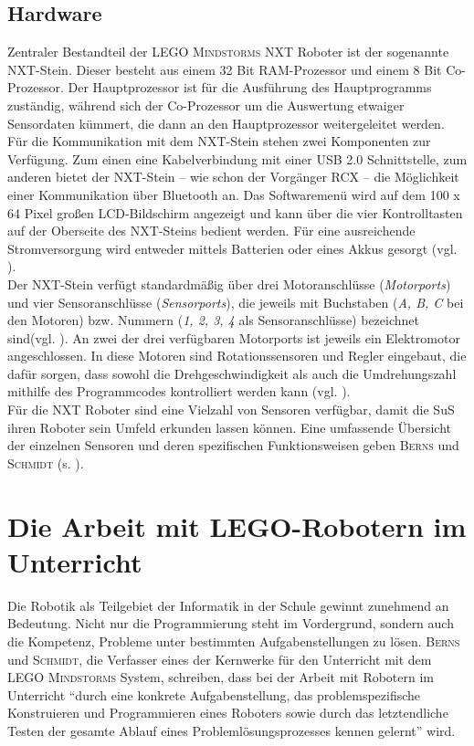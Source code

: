 \documentclass[paper=a4, DIV=calc, BCOR=15mm, twoside=on, onecolumn=on, open = right, titlepage =on, parskip =half, headsepline = on, footsepline = on, chapterprefix = off, appendixprefix = off, fontsize = 12pt, numbers = noenddot, abstract = on]{scrbook}
\begin{document}
\subsection{Hardware}
\onehalfspacing
Zentraler Bestandteil der \textsc{LEGO Mindstorms} NXT Roboter ist der sogenannte NXT-Stein. Dieser besteht aus einem 32 Bit RAM-Prozessor und einem 8 Bit Co-Prozessor. Der Hauptprozessor ist für die Ausführung des Hauptprogramms zuständig, während sich der Co-Prozessor um die Auswertung etwaiger Sensordaten kümmert, die dann an den Hauptprozessor weitergeleitet werden. Für die Kommunikation mit dem NXT-Stein stehen zwei Komponenten zur Verfügung. Zum einen eine Kabelverbindung mit einer USB 2.0 Schnittstelle, zum anderen bietet der NXT-Stein -- wie schon der Vorgänger RCX -- die Möglichkeit einer Kommunikation über Bluetooth an. Das Softwaremenü wird auf dem 100 x 64 Pixel großen LCD-Bildschirm angezeigt und kann über die vier Kontrolltasten auf der Oberseite des NXT-Steins bedient werden. Für eine ausreichende Stromversorgung wird entweder mittels Batterien oder eines Akkus gesorgt (vgl. \cite[S.42]{berns:10}).\\
Der NXT-Stein verfügt standardmäßig über drei Motoranschlüsse (\emph{Motorports}) und vier Sensoranschlüsse (\emph{Sensorports}), die jeweils mit Buchstaben (\emph{A, B, C} bei den Motoren) bzw. Nummern (\emph{1, 2, 3, 4} als Sensoranschlüsse) bezeichnet sind(vgl.  \cite[S.43]{berns:10}). An zwei der drei verfügbaren Motorports ist jeweils ein Elektromotor angeschlossen. In diese Motoren sind Rotationssensoren und Regler eingebaut, die dafür sorgen, dass sowohl die Drehgeschwindigkeit als auch die Umdrehungszahl mithilfe des Programmcodes kontrolliert werden kann (vgl. \cite[S.45--47]{berns:10}).\\
Für die NXT Roboter sind eine Vielzahl von Sensoren verfügbar, damit die SuS ihren Roboter sein Umfeld erkunden lassen können. Eine umfassende Übersicht der einzelnen Sensoren und deren spezifischen Funktionsweisen geben \textsc{Berns} und \textsc{Schmidt} (s. \cite[Kapitel 4.2]{berns:10}). 

\par \singlespacing
 \section{Die Arbeit mit LEGO-Robotern im Unterricht}
\onehalfspacing
Die Robotik als Teilgebiet der Informatik in der Schule gewinnt zunehmend an Bedeutung. Nicht nur die Programmierung steht im Vordergrund, sondern auch die Kompetenz, Probleme unter bestimmten Aufgabenstellungen zu lösen. \textsc{Berns} und \textsc{Schmidt}, die Verfasser eines der Kernwerke für den Unterricht mit dem \textsc{LEGO Mindstorms} System, schreiben, dass bei der Arbeit mit Robotern im Unterricht "`durch eine konkrete Aufgabenstellung, das problemspezifische Konstruieren und Programmieren eines Roboters sowie durch das letztendliche Testen der gesamte Ablauf eines Problemlösungsprozesses kennen gelernt"' \cite[S.2]{berns:10} wird.
\end{document}
